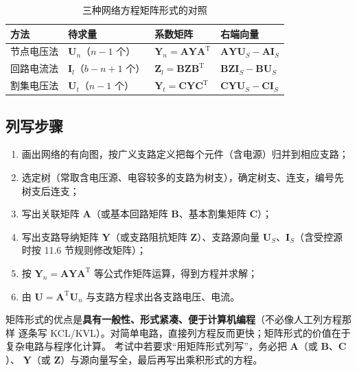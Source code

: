 \begin{table}[htbp]
  \centering
  \renewcommand{\tablename}{表}%
  \caption{三种网络方程矩阵形式的对照}
  \begin{tabular}{llll}
    \toprule
    方法 & 待求量 & 系数矩阵 & 右端向量 \\
    \midrule
    节点电压法 & $\boldsymbol{U}_n$（$n-1$ 个） & $\boldsymbol{Y}_n=\boldsymbol{A}\boldsymbol{Y}\boldsymbol{A}^{\mathrm{T}}$
      & $\boldsymbol{A}\boldsymbol{Y}\boldsymbol{U}_S-\boldsymbol{A}\boldsymbol{I}_S$ \\
    回路电流法 & $\boldsymbol{I}_l$（$b-n+1$ 个） & $\boldsymbol{Z}_l=\boldsymbol{B}\boldsymbol{Z}\boldsymbol{B}^{\mathrm{T}}$
      & $\boldsymbol{B}\boldsymbol{Z}\boldsymbol{I}_S-\boldsymbol{B}\boldsymbol{U}_S$ \\
    割集电压法 & $\boldsymbol{U}_t$（$n-1$ 个） & $\boldsymbol{Y}_t=\boldsymbol{C}\boldsymbol{Y}\boldsymbol{C}^{\mathrm{T}}$
      & $\boldsymbol{C}\boldsymbol{Y}\boldsymbol{U}_S-\boldsymbol{C}\boldsymbol{I}_S$ \\
    \bottomrule
  \end{tabular}
\end{table}

\subsection{列写步骤}
\begin{enumerate}
  \item 画出网络的有向图，按广义支路定义把每个元件（含电源）归并到相应支路；
  \item 选定树（常取含电压源、电容较多的支路为树支），确定树支、连支，编号先树支后连支；
  \item 写出关联矩阵 $\boldsymbol{A}$（或基本回路矩阵 $\boldsymbol{B}$、基本割集矩阵 $\boldsymbol{C}$）；
  \item 写出支路导纳矩阵 $\boldsymbol{Y}$（或支路阻抗矩阵 $\boldsymbol{Z}$）、支路源向量
        $\boldsymbol{U}_S$、$\boldsymbol{I}_S$（含受控源时按 11.6 节规则修改矩阵）；
  \item 按 $\boldsymbol{Y}_n=\boldsymbol{A}\boldsymbol{Y}\boldsymbol{A}^{\mathrm{T}}$ 等公式作矩阵运算，得到方程并求解；
  \item 由 $\boldsymbol{U}=\boldsymbol{A}^{\mathrm{T}}\boldsymbol{U}_n$ 与支路方程求出各支路电压、电流。
\end{enumerate}

\begin{corepoint}{矩阵形式的优点是\textbf{具有一般性、形式紧凑、便于计算机编程}（不必像人工列方程那样
逐条写 KCL/KVL）。对简单电路，直接列方程反而更快；矩阵形式的价值在于复杂电路与程序化计算。
考试中若要求“用矩阵形式列写”，务必把 $\boldsymbol{A}$（或 $\boldsymbol{B}$、$\boldsymbol{C}$）、
$\boldsymbol{Y}$（或 $\boldsymbol{Z}$）与源向量写全，最后再写出乘积形式的方程。}
\end{corepoint}

